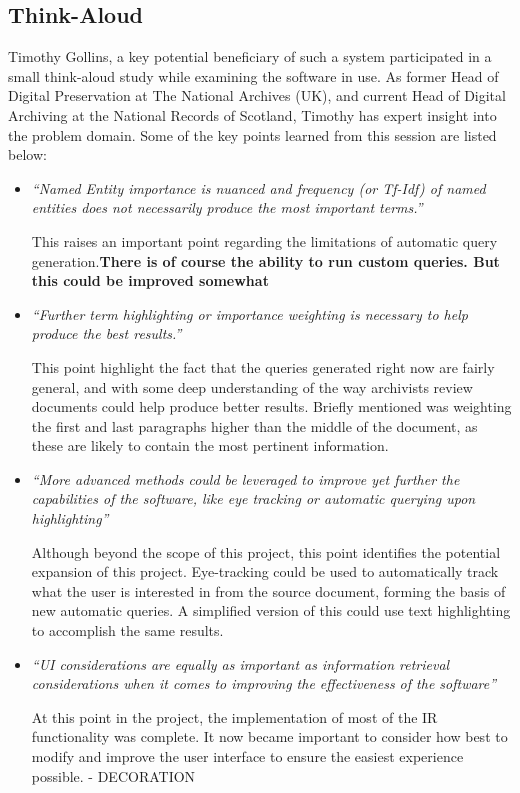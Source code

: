 \documentclass{l4proj}
\begin{document}
\subsection{Think-Aloud}

Timothy Gollins, a key potential beneficiary of such a system participated in a small think-aloud study while examining the software in use. As former Head of Digital Preservation at The National Archives (UK), and current Head of Digital Archiving at the National Records of Scotland, Timothy has expert insight into the problem domain.
Some of the key points learned from this session are listed below:

\begin{itemize}
\item \textit{``Named Entity importance is nuanced and frequency (or Tf-Idf) of named entities does not necessarily produce the most important terms.''}
\par
This raises an important point regarding the limitations of automatic query generation.\textbf{There is of course the ability to run custom queries. But this could be improved somewhat}

\item \textit{``Further term highlighting or importance weighting is necessary to help produce the best results.''}
\par
This point highlight the fact that the queries generated right now are fairly general, and with some deep understanding of the way archivists review documents could help produce better results. Briefly mentioned was weighting the first and last paragraphs higher than the middle of the document, as these are likely to contain the most pertinent information.

\item \textit{``More advanced methods could be leveraged to improve yet further the capabilities of the software, like eye tracking or automatic querying upon highlighting''}
\par
Although beyond the scope of this project, this point identifies the potential expansion of this project. Eye-tracking could be used to automatically track what the user is interested in from the source document, forming the basis of new automatic queries. A simplified version of this could use text highlighting to accomplish the same results.

\item \textit{``UI considerations are equally as important as information retrieval considerations when it comes to improving the effectiveness of the software''}
\par
At this point in the project, the implementation of most of the IR functionality was complete. It now became important to consider how best to modify and improve the user interface to ensure the easiest experience possible. - DECORATION
\end{itemize}
\end{document}
